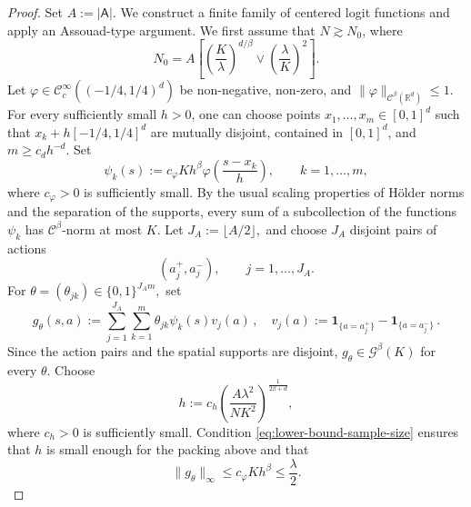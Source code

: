 \documentclass{article}
\theoremstyle{definition}
\theoremstyle{remark}
\theoremstyle{plain}
\def\eqsp{\,}
\numberwithin{equation}{section}
\begin{document}
\begin{proof}
Set \(A:=|\mathsf A|\). We construct a finite family of centered logit functions and apply an
Assouad-type argument. We first assume that \(N\gtrsim N_0\), where 
\begin{equation}
\label{eq:lower-bound-sample-size}
    N_0
   =
     A
    \left[
        \left(\frac{K}{\lambda}\right)^{d/\beta}
        \vee
        \left(\frac{\lambda}{K}\right)^2
    \right].
\end{equation}
Let
\(\varphi\in\mathcal C^\infty_c((-1/4,1/4)^d)\) be non-negative,
non-zero, and  \(\|\varphi\|_{\mathcal C^\beta(\mathbb R^d)}
    \leq1.\)
For every sufficiently small \(h>0\), one can choose points
\(x_1,\ldots,x_m\in[0,1]^d\) such that \(x_k+h[-1/4,1/4]^d\)
are mutually disjoint, contained in \([0,1]^d\), and \(m\geq c_d h^{-d}.\)
Set
\begin{equation}
\label{eq:lower-bound-bumps}
    \psi_k(s)
    :=
    c_\varphi Kh^\beta
    \varphi\left(\frac{s-x_k}{h}\right),
    \qquad
    k=1,\ldots,m,
\end{equation}
where \(c_\varphi>0\) is sufficiently small. By the usual scaling
properties of H\"older norms and the separation of the supports, every
sum of a subcollection of the functions \(\psi_k\) has
\(\mathcal C^\beta\)-norm at most \(K\). Let \(J_A:=\lfloor A/2\rfloor,\)
and choose \(J_A\) disjoint pairs of actions
\[
    (a_j^+,a_j^-),
    \qquad
    j=1,\ldots,J_A.
\]
For \(\theta
    =
    (\theta_{jk})
    \in
    \{0,1\}^{J_A m},\)
set
\begin{equation}
\label{eq:Assouad-logit-family}
    g_\theta(s,a)
    :=
    \sum_{j=1}^{J_A}
    \sum_{k=1}^m
    \theta_{jk}\psi_k(s)v_j(a)\eqsp, \quad v_j(a)
    :=
    \mathbf 1_{\{a=a_j^+\}}
    -
    \mathbf 1_{\{a=a_j^-\}}\eqsp.
\end{equation}
Since the action pairs and the spatial supports are disjoint,
\(g_\theta\in\mathcal G^\beta(K)\) for every \(\theta\).
Choose
\begin{equation}
\label{eq:lower-bound-bandwidth}
    h
    :=
    c_h
    \left(
        \frac{A\lambda^2}{NK^2}
    \right)^{\frac{1}{2\beta+d}},
\end{equation}
where \(c_h>0\) is sufficiently small. Condition
\eqref{eq:lower-bound-sample-size} ensures that \(h\) is small enough
for the packing above and that
\begin{equation}
\label{eq:small-logits-lower-bound}
    \|g_\theta\|_\infty
    \leq
    c_\varphi Kh^\beta
    \leq
    \frac{\lambda}{2}.
\end{equation}



\end{proof}
\end{document}

